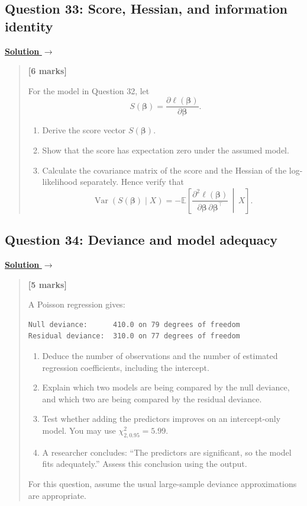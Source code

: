 \documentclass[11pt,a4paper]{article}
\newenvironment{examquestion}[2]
  {\subsection{#1}\label{question:\arabic{subsection}}\label{#2}%
   \noindent\hyperref[answer:\arabic{subsection}]{\textbf{Solution} $\rightarrow$}%
   \begin{quote}\color{statgrey}}
  {\end{quote}}
\begin{document}
\begin{examquestion}{Question 33: Score, Hessian, and information identity}{question:practice-score-hessian-and-information-identity}
\textbf{[6 marks]}

For the model in Question 32, let
\[
S(\boldsymbol\beta)
=\frac{\partial\ell(\boldsymbol\beta)}{\partial\boldsymbol\beta}.
\]
\begin{enumerate}[label=(\alph*)]
  \item Derive the score vector $S(\boldsymbol\beta)$.
  \item Show that the score has expectation zero under the assumed model.
  \item Calculate the covariance matrix of the score and the Hessian of
        the log-likelihood separately. Hence verify that
        \[
        \operatorname{Var}\!\left(S(\boldsymbol\beta)\mid X\right)
        =-\mathbb{E}\!\left[
        \frac{\partial^2\ell(\boldsymbol\beta)}
        {\partial\boldsymbol\beta\,\partial\boldsymbol\beta^\top}
        \,\middle|\,X\right].
        \]
\end{enumerate}
\end{examquestion}

\clearpage

\begin{examquestion}{Question 34: Deviance and model adequacy}{question:practice-deviance-and-model-adequacy}
\textbf{[5 marks]}

A Poisson regression gives:
\begin{verbatim}
Null deviance:      410.0 on 79 degrees of freedom
Residual deviance:  310.0 on 77 degrees of freedom
\end{verbatim}
\begin{enumerate}[label=(\alph*)]
  \item Deduce the number of observations and the number of estimated
        regression coefficients, including the intercept.
  \item Explain which two models are being compared by the null deviance,
        and which two are being compared by the residual deviance.
  \item Test whether adding the predictors improves on an intercept-only
        model. You may use $\chi^2_{2,0.95}=5.99$.
  \item A researcher concludes: ``The predictors are significant, so the
        model fits adequately.'' Assess this conclusion using the output.
\end{enumerate}
For this question, assume the usual large-sample deviance approximations
are appropriate.
\end{examquestion}
\end{document}
